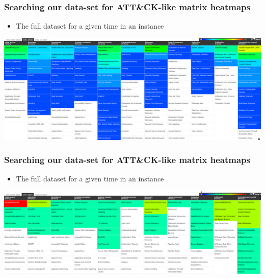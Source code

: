 \begin{frame}
  \frametitle{Searching our data-set for ATT\&CK-like matrix heatmaps}
  \begin{itemize}
    \item The full dataset for a given time in an instance
  \end{itemize}
  \includegraphics[scale=0.18]{matrix.png}
\end{frame}

\begin{frame}
  \frametitle{Searching our data-set for ATT\&CK-like matrix heatmaps}
  \begin{itemize}
    \item The full dataset for a given time in an instance
  \end{itemize}
  \includegraphics[scale=0.18]{matrix2.png}
\end{frame}

